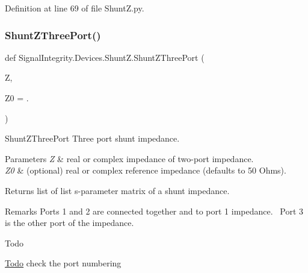 Definition at line 69 of file Shunt\+Z.\+py.

\mbox{\label{namespaceSignalIntegrity_1_1Devices_1_1ShuntZ_a4f6b7665037fa8b00407684e513e7e37}} 
\subsubsection{\texorpdfstring{Shunt\+Z\+Three\+Port()}{ShuntZThreePort()}}
{\footnotesize\ttfamily def Signal\+Integrity.\+Devices.\+Shunt\+Z.\+Shunt\+Z\+Three\+Port (\begin{DoxyParamCaption}\item[{}]{Z,  }\item[{}]{Z0 = {.} }\end{DoxyParamCaption})}



Shunt\+Z\+Three\+Port Three port shunt impedance. 


\begin{DoxyParams}{Parameters}
{\em Z} & real or complex impedance of two-\/port impedance. \\
\hline
{\em Z0} & (optional) real or complex reference impedance (defaults to 50 Ohms). \\
\hline
\end{DoxyParams}
\begin{DoxyReturn}{Returns}
list of list s-\/parameter matrix of a shunt impedance.~\newline
 
\end{DoxyReturn}
\begin{DoxyRemark}{Remarks}
Ports 1 and 2 are connected together and to port 1 impedance.~\newline
 Port 3 is the other port of the impedance.~\newline

\end{DoxyRemark}
\begin{DoxyRefDesc}{Todo}
\item[\hyperlink{todo__todo000006}{Todo}]check the port numbering \end{DoxyRefDesc}



